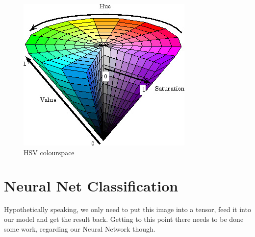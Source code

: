 \begin{figure}[H]
	\centering
	\includegraphics[width=\linewidth]{images/hsv.jpg}
	\caption{HSV colourspace \cite{hsv}}\label{fig:hsv}
	\endminipage\hfill
\end{figure}



\section{Neural Net Classification}
Hypothetically speaking, we only need to put this image into a tensor, feed it into our model and get the result back. Getting to this point there needs to be done some work, regarding our Neural Network though.  
